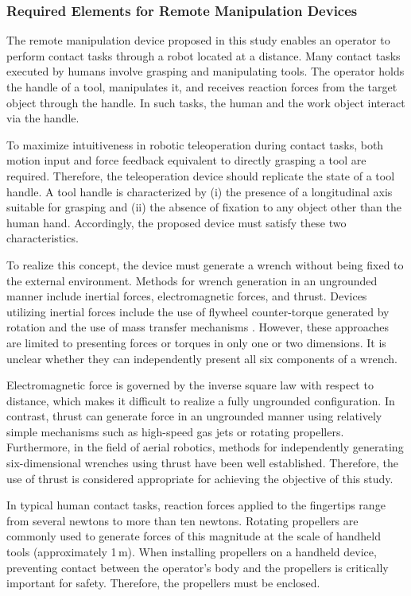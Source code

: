 \documentclass{WileyMSP-template}
\begin{document}
\subsubsection{Required Elements for Remote Manipulation Devices}

The remote manipulation device proposed in this study enables an operator to perform contact tasks through a robot located at a distance. 
Many contact tasks executed by humans involve grasping and manipulating tools. 
The operator holds the handle of a tool, manipulates it, and receives reaction forces from the target object through the handle. 
In such tasks, the human and the work object interact via the handle.

To maximize intuitiveness in robotic teleoperation during contact tasks, both motion input and force feedback equivalent to directly grasping a tool are required. 
Therefore, the teleoperation device should replicate the state of a tool handle. 
A tool handle is characterized by (i) the presence of a longitudinal axis suitable for grasping and (ii) the absence of fixation to any object other than the human hand. 
Accordingly, the proposed device must satisfy these two characteristics.

To realize this concept, the device must generate a wrench without being fixed to the external environment. 
Methods for wrench generation in an ungrounded manner include inertial forces, electromagnetic forces, and thrust. 
Devices utilizing inertial forces include the use of flywheel counter-torque generated by rotation \cite{itorqu} and the use of mass transfer mechanisms \cite{shifty}. 
However, these approaches are limited to presenting forces or torques in only one or two dimensions. 
It is unclear whether they can independently present all six components of a wrench. 

Electromagnetic force is governed by the inverse square law with respect to distance, which makes it difficult to realize a fully ungrounded configuration. 
In contrast, thrust can generate force in an ungrounded manner using relatively simple mechanisms such as high-speed gas jets or rotating propellers. 
Furthermore, in the field of aerial robotics, methods for independently generating six-dimensional wrenches using thrust have been well established. 
Therefore, the use of thrust is considered appropriate for achieving the objective of this study.

In typical human contact tasks, reaction forces applied to the fingertips range from several newtons to more than ten newtons. 
Rotating propellers are commonly used to generate forces of this magnitude at the scale of handheld tools (approximately 1\,m). 
When installing propellers on a handheld device, preventing contact between the operator’s body and the propellers is critically important for safety. 
Therefore, the propellers must be enclosed.
\end{document}
